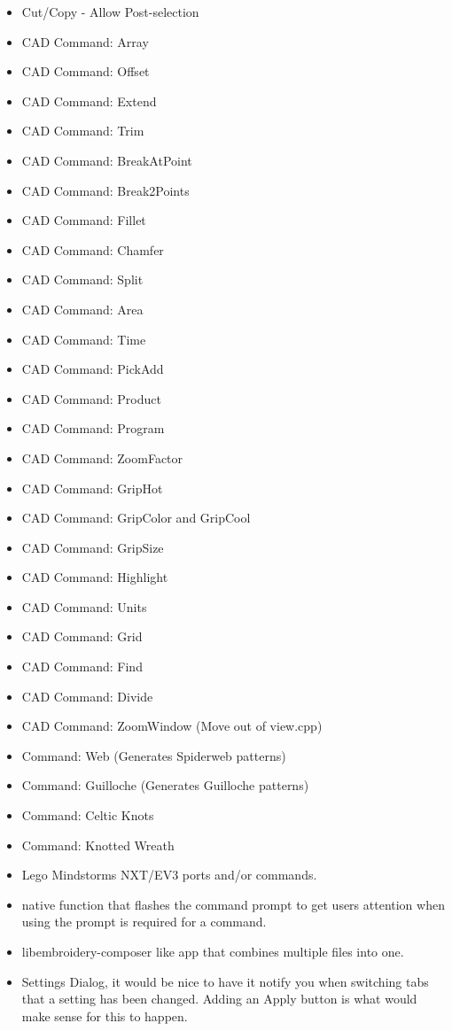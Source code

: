 \documentclass[11pt]{report}
\begin{document}
\begin{itemize}
  \item Cut/Copy - Allow Post-selection
  \item CAD Command: Array
  \item CAD Command: Offset
  \item CAD Command: Extend
  \item CAD Command: Trim
  \item CAD Command: BreakAtPoint
  \item CAD Command: Break2Points
  \item CAD Command: Fillet
  \item CAD Command: Chamfer
  \item CAD Command: Split
  \item CAD Command: Area
  \item CAD Command: Time
  \item CAD Command: PickAdd
  \item CAD Command: Product
  \item CAD Command: Program
  \item CAD Command: ZoomFactor
  \item CAD Command: GripHot
  \item CAD Command: GripColor and GripCool
  \item CAD Command: GripSize
  \item CAD Command: Highlight
  \item CAD Command: Units
  \item CAD Command: Grid
  \item CAD Command: Find
  \item CAD Command: Divide
  \item CAD Command: ZoomWindow (Move out of view.cpp)
  \item Command: Web (Generates Spiderweb patterns)
  \item Command: Guilloche (Generates Guilloche patterns)
  \item Command: Celtic Knots
  \item Command: Knotted Wreath
  \item Lego Mindstorms NXT/EV3 ports and/or commands.
  \item native function that flashes the command prompt to get users attention when using the prompt is required for a command.
  \item libembroidery-composer like app that combines multiple files into one.
  \item Settings Dialog, it would be nice to have it notify you when switching tabs that a setting has been changed. Adding an Apply button is what would make sense for this to happen.

\end{itemize}
\end{document}
